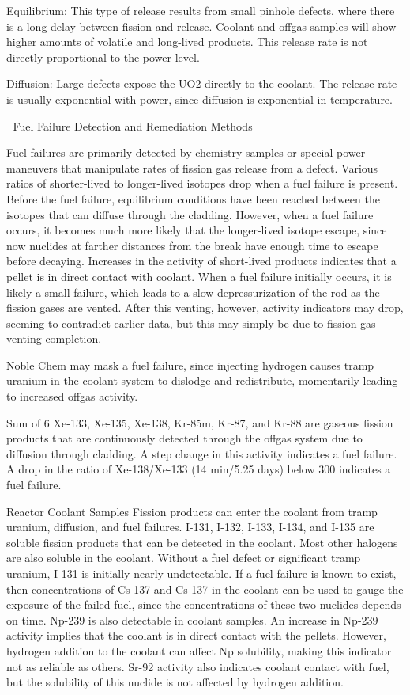 \documentclass[10pt]{article}
\begin{document}
Equilibrium: This type of release results from small pinhole defects, where there is a long delay between fission and release. Coolant and offgas samples will show higher amounts of volatile and long-lived products. This release rate is not directly proportional to the power level. 

Diffusion: Large defects expose the UO2 directly to the coolant. The release rate is usually exponential with power, since diffusion is exponential in temperature. 



Fuel Failure Detection and Remediation Methods

Fuel failures are primarily detected by chemistry samples or special power maneuvers that manipulate rates of fission gas release from a defect. Various ratios of shorter-lived to longer-lived isotopes drop when a fuel failure is present. Before the fuel failure, equilibrium conditions have been reached between the isotopes that can diffuse through the cladding. However, when a fuel failure occurs, it becomes much more likely that the longer-lived isotope escape, since now nuclides at farther distances from the break have enough time to escape before decaying. Increases in the activity of short-lived products indicates that a pellet is in direct contact with coolant. When a fuel failure initially occurs, it is likely a small failure, which leads to a slow depressurization of the rod as the fission gases are vented. After this venting, however, activity indicators may drop, seeming to contradict earlier data, but this may simply be due to fission gas venting completion.

Noble Chem may mask a fuel failure, since injecting hydrogen causes tramp uranium in the coolant system to dislodge and redistribute, momentarily leading to increased offgas activity. 

Sum of 6
Xe-133, Xe-135, Xe-138, Kr-85m, Kr-87, and Kr-88 are gaseous fission products that are continuously detected through the offgas system due to diffusion through cladding. A step change in this activity indicates a fuel failure. A drop in the ratio of Xe-138/Xe-133 (14 min/5.25 days) below 300 indicates a fuel failure. 

Reactor Coolant Samples
Fission products can enter the coolant from tramp uranium, diffusion, and fuel failures. I-131, I-132, I-133, I-134, and I-135 are soluble fission products that can be detected in the coolant. Most other halogens are also soluble in the coolant. Without a fuel defect or significant tramp uranium, I-131 is initially nearly undetectable. If a fuel failure is known to exist, then concentrations of Cs-137 and Cs-137 in the coolant can be used to gauge the exposure of the failed fuel, since the concentrations of these two nuclides depends on time. Np-239 is also detectable in coolant samples. An increase in Np-239 activity implies that the coolant is in direct contact with the pellets. However, hydrogen addition to the coolant can affect Np solubility, making this indicator not as reliable as others. Sr-92 activity also indicates coolant contact with fuel, but the solubility of this nuclide is not affected by hydrogen addition. 
\end{document}
